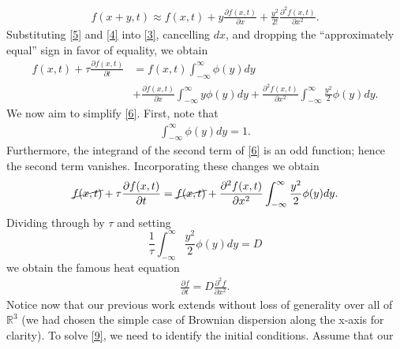 \documentclass[12pt,reqno]{amsart}
\newcommand{\rr}{\mathbb{R}}
\newcommand{\p}{\partial}
\theoremstyle{plain}  %
\theoremstyle{definition}
\begin{document}
\begin{equation}
	\begin{split}
		f(x + y, t) \approx f(x,t) + y \frac{\p f(x,t)}{\p x} +
		\frac{y^2}{2!}\frac{\p^2 f(x,t)}{\p x^2}.
		\label{5}
	\end{split}
\end{equation}
Substituting \eqref{5} and \eqref{4} into \eqref{3}, cancelling $dx$, and dropping the
``approximately equal'' sign in favor of equality, we obtain
\begin{equation}
	\begin{split}
		f(x, t ) + \tau \frac{\p f(x,t)}{\p t}
		& = f(x,t) \int_{-\infty}^{\infty} \phi(y)
		dy
		\\
		& + \frac{\p f(x,t)}{\p x} \int_{-\infty}^{\infty} y \phi(y) dy +
		\frac{\p^2 f(x,t)}{\p x^2} \int_{-\infty}^{\infty} \frac{y^2}{2}\phi(y) dy.
		\label{6}
	\end{split}
\end{equation}
We now aim to simplify \eqref{6}. First, note that 
\begin{equation*}
	\begin{split}
		\int_{-\infty}^{\infty} \phi(y) dy = 1
		\label{7}.
	\end{split}
\end{equation*}
Furthermore, the integrand of the second term of \eqref{6} is an odd function; hence
the second term vanishes. Incorporating these changes we obtain
\begin{equation*}
	\begin{split}
		\cancel{f(x, t )} + \tau \frac{\p f(x,t)}{\p t}
		= \cancel{f(x,t)} +
		\frac{\p^2 f(x,t)}{\p x^2} \int_{-\infty}^{\infty} \frac{y^2}{2}\phi(y) dy.
		\label{8}
	\end{split}
\end{equation*}
Dividing through by $\tau$ and setting 
\begin{equation*}
	\frac{1}{\tau}\int_{-\infty}^{\infty} \frac{y^2}{2}\phi(y) dy = D
\end{equation*}
we obtain the famous heat equation
\begin{equation}
	\begin{split}
		\frac{\p f}{\p t} = D \frac{\p^2 f}{\p x^2}.
		\label{9}
	\end{split}
\end{equation}
Notice now that our previous work extends
without loss of generality over all of $\rr^3$ (we had chosen the simple case of
Brownian dispersion along the x-axis for clarity). To solve \eqref{9}, we need to
identify the initial conditions. Assume that our
\end{document}
